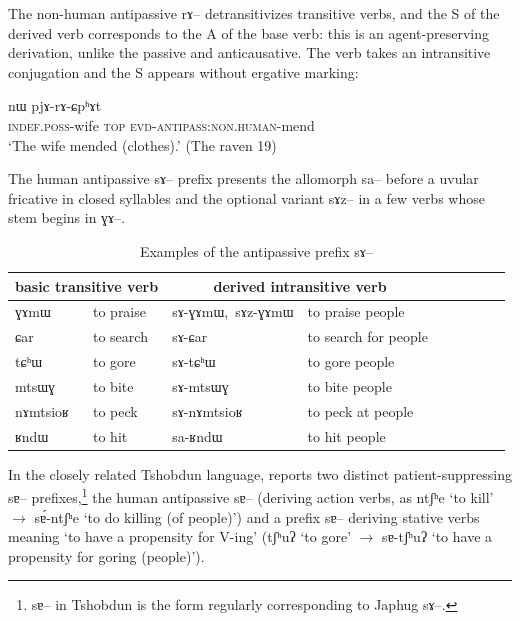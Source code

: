 \documentclass[oldfontcommands,oneside,a4paper,11pt]{article}
\newcommand{\ipa}[1]{{\phon \mbox{#1}}} %
\begin{document}
The non-human antipassive \ipa{rɤ}-- detransitivizes transitive verbs, and the S of the derived verb corresponds to the A of the base verb: this is an agent-preserving derivation, unlike the passive and anticausative. The verb takes an intransitive conjugation and the S   appears without ergative marking:

  \begin{exe}
\ex
\gll \ipa{tɤ-rʑaβ} 	\ipa{nɯ} 	\ipa{pjɤ-rɤ-ɕpʰɤt}   \\
    \textsc{indef.poss}-wife \textsc{top} \textsc{evd-antipass:non.human}-mend \\
 \glt    `The wife mended (clothes).' (The raven 19)
\end{exe} 


The human antipassive \ipa{sɤ}-- prefix   presents the allomorph \ipa{sa}-- before a uvular fricative in closed syllables  and the optional variant \ipa{sɤz}-- in a few verbs whose stem begins in \ipa{ɣɤ--}.


\begin{table}[H]
\caption{Examples of the antipassive prefix \ipa{sɤ}--}\label{tab:antipassive.jpg2}
\begin{tabular}{lllllllll} \toprule
\multicolumn{2}{c}{basic transitive verb} &\multicolumn{2}{c}{derived  intransitive verb}\\
\midrule
\ipa{ɣɤmɯ}   &	to praise &  	\ipa{sɤ-ɣɤmɯ, sɤz-ɣɤmɯ}   & to praise people\\  
\ipa{ɕar}   &	to search &  	\ipa{sɤ-ɕar}   &to search for people \\ 
\ipa{tɕʰɯ}   &	to gore &  	\ipa{sɤ-tɕʰɯ}  & to gore people \\  
\ipa{mtsɯɣ}   &	to bite &  	\ipa{sɤ-mtsɯɣ}  & to bite people  \\  
\ipa{nɤmtsioʁ}   &	to peck &  	\ipa{sɤ-nɤmtsioʁ}    & to peck at people\\  
\ipa{ʁndɯ}   &	to hit &  	\ipa{sa-ʁndɯ}   &	to hit people    \\  
\bottomrule
\end{tabular}
\end{table}

 
In the closely related Tshobdun language, \citet{jackson13morpho} reports two distinct patient-suppressing \ipa{sɐ}-- prefixes,\footnote{\ipa{sɐ}-- in Tshobdun is the form regularly corresponding to Japhug \ipa{sɤ}--.} the human antipassive \ipa{sɐ}-- (deriving action verbs, as \ipa{ntʃʰe} `to kill' $\rightarrow$ \ipa{sɐ́-ntʃʰe} `to do killing (of people)') and a prefix \ipa{sɐ}-- deriving stative verbs meaning `to have a propensity for V-ing' (\ipa{tʃʰuʔ} `to gore' $\rightarrow$ \ipa{sɐ-tʃʰuʔ} `to have a propensity for goring (people)').
\end{document}

